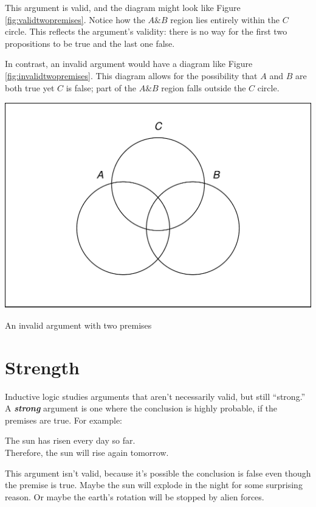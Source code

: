 \documentclass[justified]{tufte-book}
\renewcommand{\wedge}{\mathbin{\&}}
\theoremstyle{definition}
\theoremstyle{definition}
\theoremstyle{definition}
\theoremstyle{definition}
\theoremstyle{remark}
\begin{document}
This argument is valid, and the diagram might look like Figure \ref{fig:validtwopremises}. Notice how the \(A \wedge B\) region lies entirely within the \(C\) circle. This reflects the argument's validity: there is no way for the first two propositions to be true and the last one false.

In contrast, an invalid argument would have a diagram like Figure \ref{fig:invalidtwopremises}. This diagram allows for the possibility that \(A\) and \(B\) are both true yet \(C\) is false; part of the \(A \wedge B\) region falls outside the \(C\) circle.

\begin{marginfigure}
\includegraphics{_main_files/figure-latex/invalidtwopremises-1} \caption[An invalid argument with two premises]{An invalid argument with two premises}\label{fig:invalidtwopremises}
\end{marginfigure}

\hypertarget{strength}{%
\section{Strength}\label{strength}}

Inductive logic studies arguments that aren't necessarily valid, but still ``strong.'' A \textbf{\emph{strong}} argument is one where the conclusion is highly probable, if the premises are true. For example:

\begin{argument}
The sun has risen every day so far.\\
Therefore, the sun will rise again tomorrow.
\end{argument}

This argument isn't valid, because it's possible the conclusion is false even though the premise is true. Maybe the sun will explode in the night for some surprising reason. Or maybe the earth's rotation will be stopped by alien forces.
\end{document}
